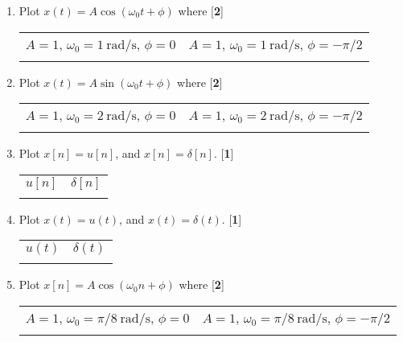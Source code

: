 \documentclass[10pt]{article}
\newcommand{\mks}[1]{\hfill
[\textbf{\small {#1}}]
}
\begin{document}
\begin{enumerate}[leftmargin=*]

\item Plot
    $
        x(t) = A\cos(\omega_0t+ \phi)
    $
    where \mks{2}

  \noindent  \begin{tabular}{cc}
        $A=1$, $\omega_0 = 1\:\mathrm{rad/s}$, $\phi = 0$ & $A=1$, $\omega_0 = 1\:\mathrm{rad/s}$, $\phi = -\pi/2$ \\
         &  \\
    \end{tabular}


\item Plot
    $
        x(t) = A\sin(\omega_0t+ \phi)
    $
    where \mks{2}

  \noindent  \begin{tabular}{cc}
        $A=1$, $\omega_0 = 2\:\mathrm{rad/s}$, $\phi = 0$ & $A=1$, $\omega_0 = 2\:\mathrm{rad/s}$, $\phi = -\pi/2$ \\
         &  \\
    \end{tabular}


    \item Plot
    $x[n] = u[n]$, and $x[n] = \delta[n]$.     \mks{1}

  \noindent  \begin{tabular}{cc}
        $u[n]$ & $\delta[n]$\\
         &  \\
    \end{tabular}


    \item Plot
    $x(t) = u(t)$, and $x(t) = \delta(t)$.     \mks{1}

  \noindent  \begin{tabular}{cc}
        $u(t)$ & $\delta(t)$\\
         &  \\
    \end{tabular}


    \item Plot
    $
        x[n] = A\cos(\omega_0n+ \phi)
    $
    where \mks{2}

  \noindent  \begin{tabular}{cc}
        $A=1$, $\omega_0 = \pi/8\:\mathrm{rad/s}$, $\phi = 0$ & $A=1$, $\omega_0 = \pi/8\:\mathrm{rad/s}$, $\phi = -\pi/2$ \\
         &  \\
    \end{tabular}



\end{enumerate}
\end{document}
